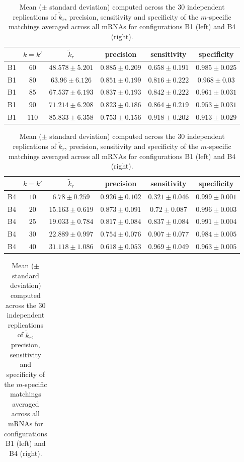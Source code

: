 \begin{table}
{\begin{minipage}{.5\linewidth}
\begin{tabular}{c|c|c|c|c|c}
        & $k=k'$ & $\tilde{k}_r$ & precision & sensitivity & specificity\\
        \hline
        B1&$ 60 $&$ 48.578 \pm 5.201 $&$ 0.885 \pm 0.209 $&$ 0.658 \pm 0.191 $&$ 0.985 \pm 0.025 $\\
        B1&$ 80 $&$ 63.96 \pm 6.126 $&$ 0.851 \pm 0.199 $&$ 0.816 \pm 0.222 $&$ 0.968 \pm 0.03 $\\
        B1&$ 85 $&$ 67.537 \pm 6.193 $&$ 0.837 \pm 0.193 $&$ 0.842 \pm 0.222 $&$ 0.961 \pm 0.031 $\\
        B1&$ 90 $&$ 71.214 \pm 6.208 $&$ 0.823 \pm 0.186 $&$ 0.864 \pm 0.219 $&$ 0.953 \pm 0.031 $\\
        B1&$ 110 $&$ 85.833 \pm 6.358 $&$ 0.753 \pm 0.156 $&$ 0.918 \pm 0.202 $&$ 0.913 \pm 0.029 $\\
        \hline
      \end{tabular}
    \end{minipage}%
    \begin{minipage}{.5\linewidth}
      \centering
      \begin{tabular}{c|c|c|c|c|c}
        & $k=k'$ & $\tilde{k}_r$ & precision & sensitivity & specificity\\
        \hline
        B4&$ 10 $&$ 6.78 \pm 0.259 $&$ 0.926 \pm 0.102 $&$ 0.321 \pm 0.046 $&$ 0.999 \pm 0.001 $\\
        B4&$ 20 $&$ 15.163 \pm 0.619 $&$ 0.873 \pm 0.091 $&$ 0.72 \pm 0.087 $&$ 0.996 \pm 0.003 $\\
        B4&$ 25 $&$ 19.033 \pm 0.784 $&$ 0.817 \pm 0.084 $&$ 0.837 \pm 0.084 $&$ 0.991 \pm 0.004 $\\
        B4&$ 30 $&$ 22.889 \pm 0.997 $&$ 0.754 \pm 0.076 $&$ 0.907 \pm 0.077 $&$ 0.984 \pm 0.005 $\\
        B4&$ 40 $&$ 31.118 \pm 1.086 $&$ 0.618 \pm 0.053 $&$ 0.969 \pm 0.049 $&$ 0.963 \pm 0.005 $\\
        \hline
      \end{tabular}
  \end{minipage}
  \caption{Mean   ($\pm$  standard   deviation)  computed   across  the   30
    independent replications of  $\tilde{k}_{r}$, precision, sensitivity and
    specificity of the $m$-specific matchings  averaged across all mRNAs for
    configurations           B1            (left)           and           B4
    (right).  \label{tab:simulB14:results:matching}}
    \begin{minipage}{.5\linewidth}
      \centering
      \begin{tabular}{c|c|c|c|c|c}

\end{tabular}
\end{minipage}}
\end{table}
